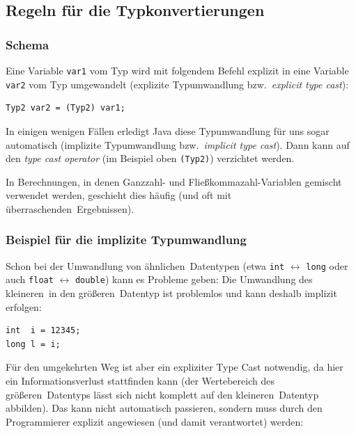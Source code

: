 \subsection{Regeln für die Typkonvertierungen}

\subsubsection{Schema}

Eine Variable \lstinline|var1| vom Typ  wird mit folgendem Befehl
explizit in eine Variable \lstinline|var2| vom Typ  umgewandelt
(explizite Typumwandlung bzw.\ \emph{explicit type cast}):

\begin{lstlisting}
Typ2 var2 = (Typ2) var1;
\end{lstlisting}

In einigen wenigen Fällen erledigt Java diese Typumwandlung für uns sogar
automatisch (implizite Typumwandlung bzw.\ \emph{implicit type cast}). Dann kann
auf den \emph{type cast operator} (im Beispiel oben \lstinline|(Typ2)|)
verzichtet werden.

In Berechnungen, in denen Ganzzahl- und Fließkommazahl-Variablen gemischt
verwendet werden, geschieht dies häufig (und oft mit \glqq überraschenden\grqq\
Ergebnissen).

\subsubsection{Beispiel für die implizite Typumwandlung}

Schon bei der Umwandlung von \glqq ähnlichen\grqq\ Datentypen
(etwa \lstinline|int| $\leftrightarrow$ \lstinline|long| oder auch
\lstinline|float| $\leftrightarrow$ \lstinline|double|) kann es Probleme geben:
Die Umwandlung des \glqq kleineren\grqq\ in den \glqq größeren\grqq\ Datentyp
ist problemlos und kann deshalb implizit erfolgen:

\begin{lstlisting}
int  i = 12345;
long l = i;
\end{lstlisting}

Für den umgekehrten Weg ist aber ein expliziter Type Cast notwendig, da hier ein
Informationsverlust stattfinden kann (der Wertebereich des \glqq größeren\grqq\
Datentyps lässt sich nicht komplett auf den \glqq kleineren\grqq\ Datentyp
abbilden). Das kann nicht automatisch passieren, sondern muss durch den
Programmierer explizit angewiesen (und damit verantwortet) werden:

